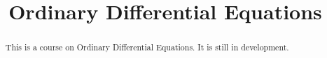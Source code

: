 \documentclass[12pt]{xourse}
\title{Ordinary Differential Equations}
\begin{document}
\begin{abstract}
This is a course on Ordinary Differential Equations. It is still in development.
\end{abstract} 

\maketitle

\end{document}
